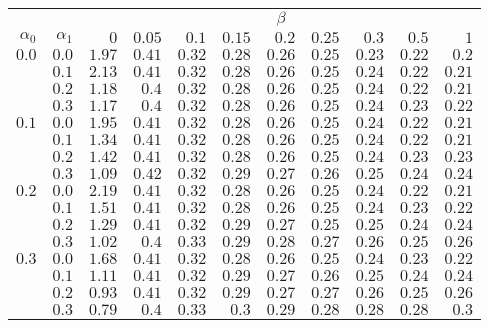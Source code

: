 \begin{tabular}{rr|rrrrrrrrr}
\hline\hline
 && \multicolumn{9}{c}{$\beta$}\\
 $\alpha_0$ & $\alpha_1$ & $0$ & $0.05$ & $0.1$ & $0.15$ & $0.2$ & $0.25$ & $0.3$ & $0.5$ & $1$ \\ 
 \hline
$0.0$ & $0.0$ & $1.97$ & $0.41$ & $0.32$ & $0.28$ & $0.26$ & $0.25$ & $0.23$ & $0.22$ & $0.2$\\ 
 & $0.1$ & $2.13$ & $0.41$ & $0.32$ & $0.28$ & $0.26$ & $0.25$ & $0.24$ & $0.22$ & $0.21$\\ 
 & $0.2$ & $1.18$ & $0.4$ & $0.32$ & $0.28$ & $0.26$ & $0.25$ & $0.24$ & $0.22$ & $0.21$\\ 
 & $0.3$ & $1.17$ & $0.4$ & $0.32$ & $0.28$ & $0.26$ & $0.25$ & $0.24$ & $0.23$ & $0.22$\\ 
\hline 
 $0.1$ & $0.0$ & $1.95$ & $0.41$ & $0.32$ & $0.28$ & $0.26$ & $0.25$ & $0.24$ & $0.22$ & $0.21$\\ 
 & $0.1$ & $1.34$ & $0.41$ & $0.32$ & $0.28$ & $0.26$ & $0.25$ & $0.24$ & $0.22$ & $0.21$\\ 
 & $0.2$ & $1.42$ & $0.41$ & $0.32$ & $0.28$ & $0.26$ & $0.25$ & $0.24$ & $0.23$ & $0.23$\\ 
 & $0.3$ & $1.09$ & $0.42$ & $0.32$ & $0.29$ & $0.27$ & $0.26$ & $0.25$ & $0.24$ & $0.24$\\ 
\hline 
 $0.2$ & $0.0$ & $2.19$ & $0.41$ & $0.32$ & $0.28$ & $0.26$ & $0.25$ & $0.24$ & $0.22$ & $0.21$\\ 
 & $0.1$ & $1.51$ & $0.41$ & $0.32$ & $0.28$ & $0.26$ & $0.25$ & $0.24$ & $0.23$ & $0.22$\\ 
 & $0.2$ & $1.29$ & $0.41$ & $0.32$ & $0.29$ & $0.27$ & $0.25$ & $0.25$ & $0.24$ & $0.24$\\ 
 & $0.3$ & $1.02$ & $0.4$ & $0.33$ & $0.29$ & $0.28$ & $0.27$ & $0.26$ & $0.25$ & $0.26$\\ 
\hline 
 $0.3$ & $0.0$ & $1.68$ & $0.41$ & $0.32$ & $0.28$ & $0.26$ & $0.25$ & $0.24$ & $0.23$ & $0.22$\\ 
 & $0.1$ & $1.11$ & $0.41$ & $0.32$ & $0.29$ & $0.27$ & $0.26$ & $0.25$ & $0.24$ & $0.24$\\ 
 & $0.2$ & $0.93$ & $0.41$ & $0.32$ & $0.29$ & $0.27$ & $0.27$ & $0.26$ & $0.25$ & $0.26$\\ 
 & $0.3$ & $0.79$ & $0.4$ & $0.33$ & $0.3$ & $0.29$ & $0.28$ & $0.28$ & $0.28$ & $0.3$\\ 
 \hline 
 \end{tabular}